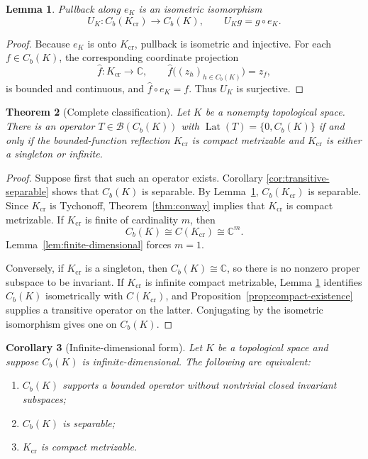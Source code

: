 \documentclass[11pt]{article}
\newtheorem{theorem}{Theorem}[section]
\newtheorem{lemma}[theorem]{Lemma}
\newtheorem{corollary}[theorem]{Corollary}
\theoremstyle{remark}
\newcommand{\Cb}{C_b}
\newcommand{\B}{\mathcal B}
\newcommand{\Lat}{\operatorname{Lat}}
\newcommand{\C}{\mathbb C}
\begin{document}
\begin{lemma}\label{lem:reflection}
Pullback along $e_K$ is an isometric isomorphism
\[
  U_K:\Cb(K_{\mathrm{cr}})\longrightarrow \Cb(K),
  \qquad U_Kg=g\circ e_K.
\]
\end{lemma}

\begin{proof}
Because $e_K$ is onto $K_{\mathrm{cr}}$, pullback is isometric and injective.
For each $f\in\Cb(K)$, the corresponding coordinate projection
\[
  \widehat f:K_{\mathrm{cr}}\to\C,
  \qquad \widehat f\bigl((z_h)_{h\in\Cb(K)}\bigr)=z_f,
\]
is bounded and continuous, and $\widehat f\circ e_K=f$.  Thus $U_K$ is
surjective.
\end{proof}

\begin{theorem}[Complete classification]\label{thm:main}
Let $K$ be a nonempty topological space.  There is an operator
$T\in\B(\Cb(K))$ with $\Lat(T)=\{0,\Cb(K)\}$ if and only if the
bounded-function reflection $K_{\mathrm{cr}}$ is compact metrizable and
$K_{\mathrm{cr}}$ is either a singleton or infinite.
\end{theorem}

\begin{proof}
Suppose first that such an operator exists.  Corollary
\ref{cor:transitive-separable} shows that $\Cb(K)$ is separable.  By
Lemma~\ref{lem:reflection}, $\Cb(K_{\mathrm{cr}})$ is separable.  Since
$K_{\mathrm{cr}}$ is Tychonoff, Theorem~\ref{thm:conway} implies that
$K_{\mathrm{cr}}$ is compact metrizable.  If $K_{\mathrm{cr}}$ is finite of
cardinality $m$, then
\[
  \Cb(K)\cong C(K_{\mathrm{cr}})\cong\C^m.
\]
Lemma~\ref{lem:finite-dimensional} forces $m=1$.

Conversely, if $K_{\mathrm{cr}}$ is a singleton, then
$\Cb(K)\cong\C$, so there is no nonzero proper subspace to be invariant.  If
$K_{\mathrm{cr}}$ is infinite compact metrizable, Lemma
\ref{lem:reflection} identifies $\Cb(K)$ isometrically with
$C(K_{\mathrm{cr}})$, and Proposition~\ref{prop:compact-existence} supplies
a transitive operator on the latter.  Conjugating by the isometric
isomorphism gives one on $\Cb(K)$.
\end{proof}

\begin{corollary}[Infinite-dimensional form]\label{cor:infinite}
Let $K$ be a topological space and suppose $\Cb(K)$ is infinite-dimensional.
The following are equivalent:
\begin{enumerate}[label=\textup{(\roman*)},leftmargin=2.2em]
  \item $\Cb(K)$ supports a bounded operator without nontrivial closed
        invariant subspaces;
  \item $\Cb(K)$ is separable;
  \item $K_{\mathrm{cr}}$ is compact metrizable.
\end{enumerate}
\end{corollary}
\end{document}

